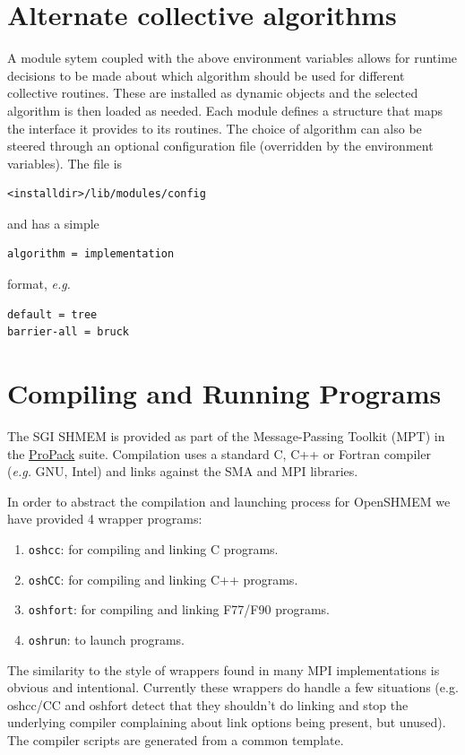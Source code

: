 \documentclass[english]{article}
\begin{document}
\section{Alternate collective algorithms}

A module sytem coupled with the above environment variables allows
for runtime decisions to be made about which algorithm should be used
for different collective routines. These are installed as dynamic
objects and the selected algorithm is then loaded as needed. Each
module defines a structure that maps the interface it provides to
its routines. The choice of algorithm can also be steered through
an optional configuration file (overridden by the environment variables).
The file is


\begin{lstlisting}
<installdir>/lib/modules/config
\end{lstlisting}


and has a simple


\begin{lstlisting}
algorithm = implementation
\end{lstlisting}


format, \emph{e.g.}


\begin{lstlisting}
default = tree
barrier-all = bruck
\end{lstlisting}



\section{Compiling and Running Programs}

The SGI SHMEM is provided as part of the Message-Passing Toolkit (MPT)
in the \href{http://www.sgi.com/products/software/propack.html}{ProPack}
suite. Compilation uses a standard C, C++ or Fortran compiler (\emph{e.g.}
GNU, Intel) and links against the SMA and MPI libraries.

In order to abstract the compilation and launching process for OpenSHMEM
we have provided 4 wrapper programs:
\begin{enumerate}
\item \texttt{oshcc}: for compiling and linking C programs.
\item \texttt{oshCC}: for compiling and linking C++ programs.
\item \texttt{oshfort}: for compiling and linking F77/F90 programs.
\item \texttt{oshrun}: to launch programs.
\end{enumerate}
The similarity to the style of wrappers found in many MPI implementations
is obvious and intentional. Currently these wrappers do handle a few
situations (e.g. oshcc/CC and oshfort detect that they shouldn't do
linking and stop the underlying compiler complaining about link options
being present, but unused). The compiler scripts are generated from
a common template.
\end{document}
